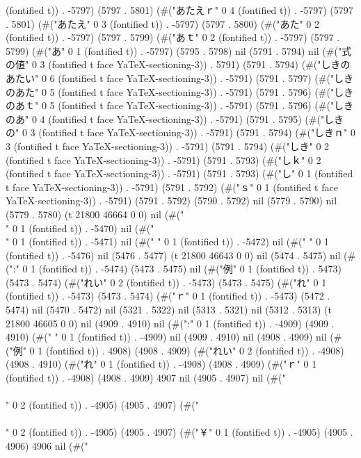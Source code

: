 (fontified t)) . -5797) (5797 . 5801) (#("あたえｒ" 0 4 (fontified t)) . -5797) (5797 . 5801) (#("あたえ" 0 3 (fontified t)) . -5797) (5797 . 5800) (#("あた" 0 2 (fontified t)) . -5797) (5797 . 5799) (#("あｔ" 0 2 (fontified t)) . -5797) (5797 . 5799) (#("あ" 0 1 (fontified t)) . -5797) (5795 . 5798) nil (5791 . 5794) nil (#("式の値" 0 3 (fontified t face YaTeX-sectioning-3)) . 5791) (5791 . 5794) (#("しきのあたい" 0 6 (fontified t face YaTeX-sectioning-3)) . -5791) (5791 . 5797) (#("しきのあた" 0 5 (fontified t face YaTeX-sectioning-3)) . -5791) (5791 . 5796) (#("しきのあｔ" 0 5 (fontified t face YaTeX-sectioning-3)) . -5791) (5791 . 5796) (#("しきのあ" 0 4 (fontified t face YaTeX-sectioning-3)) . -5791) (5791 . 5795) (#("しきの" 0 3 (fontified t face YaTeX-sectioning-3)) . -5791) (5791 . 5794) (#("しきｎ" 0 3 (fontified t face YaTeX-sectioning-3)) . -5791) (5791 . 5794) (#("しき" 0 2 (fontified t face YaTeX-sectioning-3)) . -5791) (5791 . 5793) (#("しｋ" 0 2 (fontified t face YaTeX-sectioning-3)) . -5791) (5791 . 5793) (#("し" 0 1 (fontified t face YaTeX-sectioning-3)) . -5791) (5791 . 5792) (#("ｓ" 0 1 (fontified t face YaTeX-sectioning-3)) . -5791) (5791 . 5792) (5790 . 5792) nil (5779 . 5790) nil (5779 . 5780) (t 21800 46664 0 0) nil (#("\\" 0 1 (fontified t)) . -5470) nil (#("\\" 0 1 (fontified t)) . -5471) nil (#("
" 0 1 (fontified t)) . -5472) nil (#("
" 0 1 (fontified t)) . -5476) nil (5476 . 5477) (t 21800 46643 0 0) nil (5474 . 5475) nil (#(":" 0 1 (fontified t)) . -5474) (5473 . 5475) nil (#("例" 0 1 (fontified t)) . 5473) (5473 . 5474) (#("れい" 0 2 (fontified t)) . -5473) (5473 . 5475) (#("れ" 0 1 (fontified t)) . -5473) (5473 . 5474) (#("ｒ" 0 1 (fontified t)) . -5473) (5472 . 5474) nil (5470 . 5472) nil (5321 . 5322) nil (5313 . 5321) nil (5312 . 5313) (t 21800 46605 0 0) nil (4909 . 4910) nil (#(":" 0 1 (fontified t)) . -4909) (4909 . 4910) (#("
" 0 1 (fontified t)) . -4909) nil (4909 . 4910) nil (4908 . 4909) nil (#("例" 0 1 (fontified t)) . 4908) (4908 . 4909) (#("れい" 0 2 (fontified t)) . -4908) (4908 . 4910) (#("れ" 0 1 (fontified t)) . -4908) (4908 . 4909) (#("ｒ" 0 1 (fontified t)) . -4908) (4908 . 4909) 4907 nil (4905 . 4907) nil (#("\\\\" 0 2 (fontified t)) . -4905) (4905 . 4907) (#("\\\\" 0 2 (fontified t)) . -4905) (4905 . 4907) (#("￥" 0 1 (fontified t)) . -4905) (4905 . 4906) 4906 nil (#("
